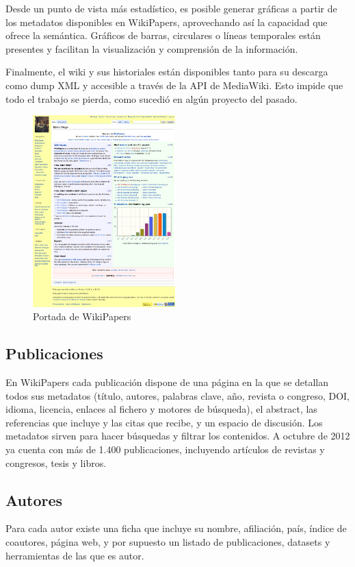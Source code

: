 \documentclass[11pt,twocolumn]{article}
\begin{document}
Desde un punto de vista más estadístico, es posible generar gráficas a partir de los metadatos disponibles en WikiPapers, aprovechando así la capacidad que ofrece la semántica. Gráficos de barras, circulares o líneas temporales están presentes y facilitan la visualización y comprensión de la información.

Finalmente, el wiki y sus historiales están disponibles tanto para su descarga como dump XML y accesible a través de la API de MediaWiki. Esto impide que todo el trabajo se pierda, como sucedió en algún proyecto del pasado.

\begin{figure}[htb]
\centering
\includegraphics[width=0.49\textwidth]{wpfull.png}
\caption{Portada de WikiPapers}
\label{fig:wpfull}
\end{figure}

\subsection{Publicaciones}
En WikiPapers cada publicación dispone de una página en la que se detallan todos sus metadatos (título, autores, palabras clave, año, revista o congreso, DOI, idioma, licencia, enlaces al fichero y motores de búsqueda), el abstract, las referencias que incluye y las citas que recibe, y un espacio de discusión. Los metadatos sirven para hacer búsquedas y filtrar los contenidos. A octubre de 2012 ya cuenta con más de 1.400 publicaciones, incluyendo artículos de revistas y congresos, tesis y libros.

\subsection{Autores}
Para cada autor existe una ficha que incluye su nombre, afiliación, país, índice de coautores, página web, y por supuesto un listado de publicaciones, datasets y herramientas de las que es autor.
\end{document}
